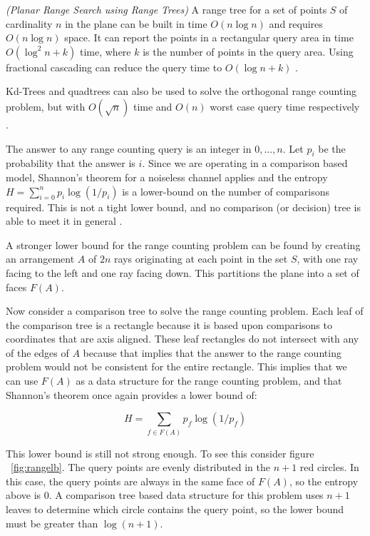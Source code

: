 \documentclass[mcs]{scsthesis}
\begin{document}
\begin{thm} \emph{(Planar Range Search using Range Trees)} 
A range tree for a set of points \(S\) of cardinality \(n\) in the plane can be
built in time \(O(n \log n)\) and requires \(O(n \log n)\) space. It can report
the points in a rectangular query area in time \(O(\log^2 n + k)\) time, where
\(k\) is the number of points in the query area. Using fractional cascading can
reduce the query time to \(O(\log n + k)\) \cite{dutch}. 
\end{thm}

Kd-Trees and quadtrees can also be used to solve the orthogonal range counting
problem, but with \(O(\sqrt n)\) time and \(O(n)\) worst case query time
respectively \cite{dutch}.

The answer to any range counting query is an integer in \({0, ..., n}\). Let
\(p_i\) be the probability that the answer is \(i\). Since we are operating in a
comparison based model, Shannon's theorem for a noiseless channel applies and
the entropy \(H=\sum_{i=0}^n{p_i\log(1/p_i)}\) is a lower-bound on the number of
comparisons required. This is not a tight lower bound, and no comparison (or
decision) tree is able to meet it in general \cite{biasedrange}.

A stronger lower bound for the range counting problem can be found by creating
an arrangement \(A\) of \(2n\) rays originating at each point in the set \(S\),
with one ray facing to the left and one ray facing down. This partitions the
plane into a set of faces \(F(A)\).

Now consider a comparison tree to solve the range counting problem. Each leaf of
the comparison tree is a rectangle because it is based upon comparisons to
coordinates that are axis aligned.  These leaf rectangles do not intersect with
any of the edges of \(A\) because that implies that the answer to the range
counting problem would not be consistent for the entire rectangle. This implies
that we can use \(F(A)\) as a data structure for the range counting problem,
and that Shannon's theorem once again provides a lower bound of:

$$
H=\sum_{f \in F(A)}{p_f\log(1/p_f)}
$$

This lower bound is still not strong enough. To see this consider figure
~\ref{fig:rangelb}. The query points are evenly distributed in the \(n + 1\)
red circles. In this case, the query points are always in the same face of
\(F(A)\), so the entropy above is 0. A comparison tree based data structure
for this problem uses \(n + 1\) leaves to determine which circle contains
the query point, so the lower bound must be greater than \(\log(n + 1)\).
\end{document}
